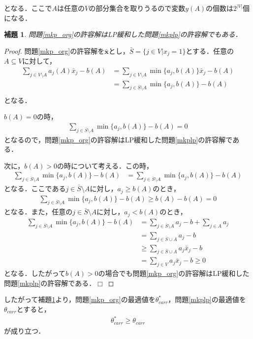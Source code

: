 \documentclass[11pt,dvipdfmx]{jarticle}
\def\qed{\hfill $\Box$}
\numberwithin{equation}{section}
\newtheorem{lem}{補題}[section]
\newtheorem{proof}{証明}
\begin{document}
            となる\cite{apx_des}．ここで$A$は任意の$V$の部分集合を取りうるので変数$y(A)$の個数は$2^{|V|}$個になる．\par
            \begin{lem}
                問題\eqref{mkp_org}の許容解は\rm LP緩和した問題\eqref{mkplp}の許容解でもある．
                \label{lem_kplp}
            \end{lem}
            \begin{proof}
                問題\eqref{mkp_org}の許容解を$\bar{\bm{x}}$とし，$\bar{S}=\{j\in V|x_j=1\}$とする．任意の$A\subseteq V$に対して，
                \begin{align}
                    \sum_{j\in V\setminus A}{a_j(A)\bar{x}_j}-b(A) &= \sum_{j\in V\setminus A}{\min\{a_j,b(A)\}\bar{x}_j}-b(A)\\
                    &=\sum_{j\in\bar{S}\setminus A}{\min\{a_j,b(A)\}}-b(A)\\
                \end{align}
                となる．\par
                $b(A)=0$の時，
                \begin{align}
                    \sum_{j\in\bar{S}\setminus A}{\min\{a_j,b(A)\}}-b(A)=0
                \end{align}
                となるので，問題\eqref{mkp_org}の許容解は\rm LP緩和した問題\eqref{mkplp}の許容解である．\par
                次に，$b(A)>0$の時について考える．この時，
                \begin{align}
                    \sum_{j\in\bar{S}\setminus A}{\min\{a_j,b(A)\}}-b(A) &= \sum_{j\in\bar{S}\setminus A}{\min\{a_j,b(A)\}}-b(A)
                \end{align}
                となる．ここである$j\in \bar{S}\setminus A$に対し，$a_j\ge b(A)$のとき，
                \begin{align}
                    \sum_{j\in\bar{S}\setminus A}{\min\{a_j,b(A)\}}-b(A) \ge b(A)-b(A)=0
                \end{align}
                となる．また，任意の$j\in \bar{S}\setminus A$に対し，$a_j<b(A)$のとき，
                \begin{align}
                    \sum_{j\in\bar{S}\setminus A}{\min\{a_j,b(A)\}}-b(A) &= \sum_{j\in\bar{S}\setminus A}{a_j}-b+\sum_{j\in A}{a_j}\\
                    &=\sum_{j\in\bar{S}\cup A}{a_j}-b\\
                    &\ge \sum_{j\in\bar{S}\cup A}{a_j\bar{x}_j}-b\\
                    &= \sum_{j\in V}{a_j\bar{x}_j}-b \ge 0
                \end{align}
                となる．したがって$b(A)>0$の場合でも問題\eqref{mkp_org}の許容解はLP緩和した問題\eqref{mkplp}の許容解である．\qed
            \end{proof}
            したがって補題\ref{lem_kplp}より，問題\eqref{mkp_org}の最適値を$\theta_{carr}^*$，問題\eqref{mkplp}の最適値を$\theta_{carr}$とすると，
            \begin{align}
                \theta_{carr}^*\ge\theta_{carr}
            \end{align}
            が成り立つ．
\end{document}
